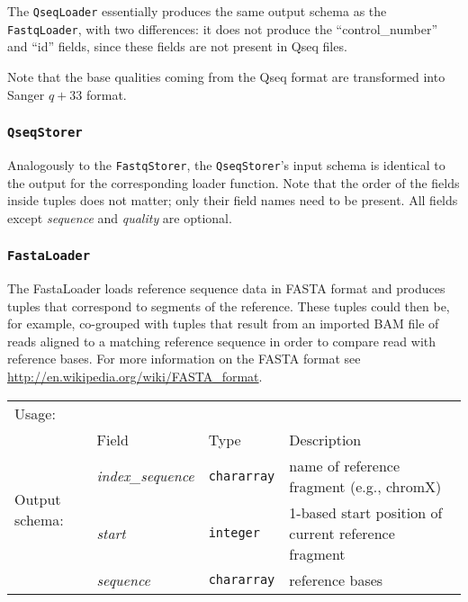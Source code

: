 The \texttt{QseqLoader} essentially produces the same output schema as the
\texttt{FastqLoader}, with two differences:  it does not produce the
``control\_number'' and ``id'' fields, since these fields are not present in
Qseq files.

Note that the base qualities coming from the Qseq format are transformed into
Sanger $q + 33$ format.

\subsubsection{\texttt{QseqStorer}}

Analogously to the \texttt{FastqStorer}, the \texttt{QseqStorer}'s 
input schema is identical to the output for the corresponding loader function.
Note that the order of the fields inside tuples does not
matter; only their field names need to be present. All fields except
\emph{sequence} and \emph{quality} are optional.


\subsubsection{\texttt{FastaLoader}}

The FastaLoader loads reference sequence data in FASTA format and
produces tuples that correspond to segments of the reference. These
tuples could then be, for example, co-grouped with tuples that result
from an imported BAM file of reads aligned to a matching reference
sequence in order to compare read with reference bases. For more
information on the FASTA format see
\url{http://en.wikipedia.org/wiki/FASTA_format}.

\begin{tabular}{lp{}p{}p{}}
Usage: & \multicolumn{3}{l}{}
\hspace*{-0.55cm}\begin{minipage}{0.7\textwidth}
  \begin{lstlisting}
  reference_bases = load 'hg19.fa' using FastaLoader();
  \end{lstlisting}
  \end{minipage}\hfill\kern-\arrayrulewidth
 \\[0.25cm]
\multirow{4}{*}{Output schema:} & Field & Type & Description\\[0.1cm]
& \emph{index\_sequence} & \texttt{chararray} & name of reference fragment (e.g., chromX)\\
& \emph{start} & \texttt{integer} & 1-based start position of current reference fragment\\
& \emph{sequence} & \texttt{chararray} & reference bases
\end{tabular}

